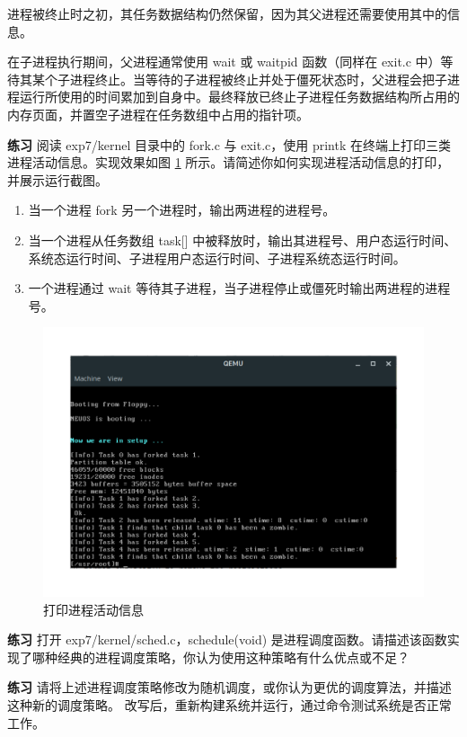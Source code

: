 进程被终止时之初，其任务数据结构仍然保留，因为其父进程还需要使用其中的信息。

在子进程执行期间，父进程通常使用 wait 或 waitpid 函数（同样在 exit.c 中）等待其某个子进程终止。当等待的子进程被终止并处于僵死状态时，父进程会把子进程运行所使用的时间累加到自身中。最终释放已终止子进程任务数据结构所占用的内存页面，并置空子进程在任务数组中占用的指针项。

\begin{mdframed}[hidealllines=true,backgroundcolor=gray!20]
\textbf{练习 }阅读 exp7/kernel 目录中的 fork.c 与 exit.c，使用 printk 在终端上打印三类进程活动信息。实现效果如图 \ref{fig:打印进程活动信息} 所示。请简述你如何实现进程活动信息的打印，并展示运行截图。

\begin{enumerate}
    \item 当一个进程 fork 另一个进程时，输出两进程的进程号。
    \item 当一个进程从任务数组 task[] 中被释放时，输出其进程号、用户态运行时间、系统态运行时间、子进程用户态运行时间、子进程系统态运行时间。
    \item 一个进程通过 wait 等待其子进程，当子进程停止或僵死时输出两进程的进程号。
\end{enumerate}
\end{mdframed}

\begin{figure}[htbp]
    \centering
    \includegraphics[width=\textwidth]{img/打印进程活动信息.pdf}
    \caption{打印进程活动信息}
    \label{fig:打印进程活动信息}
\end{figure}

\begin{mdframed}[hidealllines=true,backgroundcolor=gray!20]
\textbf{练习 }
打开 exp7/kernel/sched.c，schedule(void) 是进程调度函数。请描述该函数实现了哪种经典的进程调度策略，你认为使用这种策略有什么优点或不足？
\end{mdframed}

\begin{mdframed}[hidealllines=true,backgroundcolor=gray!20]
\textbf{练习 }
请将上述进程调度策略修改为随机调度，或你认为更优的调度算法，并描述这种新的调度策略。
改写后，重新构建系统并运行，通过命令测试系统是否正常工作。
\end{mdframed}
